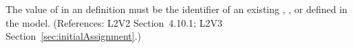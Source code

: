 The value of  in an \InitialAssignment definition must be the
identifier of an existing \Compartment, \Species, or \Parameter defined in
the model.  (References: L2V2 Section~4.10.1; L2V3
Section~\ref{sec:initialAssignment}.)
